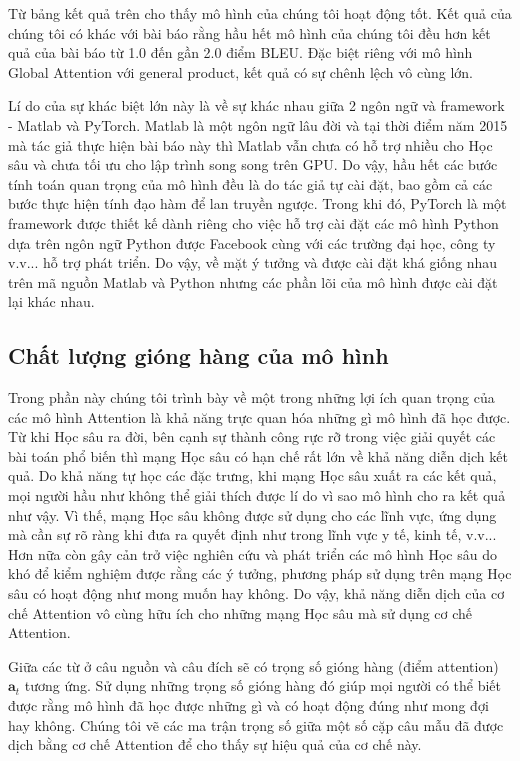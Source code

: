 Từ bảng kết quả trên cho thấy mô hình của chúng tôi hoạt động tốt. Kết quả của chúng tôi có khác với bài báo rằng hầu hết mô hình của chúng tôi đều hơn kết quả của bài báo từ 1.0 đến gần 2.0 điểm BLEU. Đặc biệt riêng với mô hình Global Attention với general product, kết quả có sự chênh lệch vô cùng lớn.

Lí do của sự khác biệt lớn này là về sự khác nhau giữa 2 ngôn ngữ và framework - Matlab và PyTorch. Matlab là một ngôn ngữ lâu đời và tại thời điểm năm 2015 mà tác giả thực hiện bài báo này thì Matlab vẫn chưa có hỗ trợ nhiều cho Học sâu và chưa tối ưu cho lập trình song song trên GPU. Do vậy, hầu hết các bước tính toán quan trọng của mô hình đều là do tác giả tự cài đặt, bao gồm cả các bước thực hiện tính đạo hàm để lan truyền ngược. Trong khi đó, PyTorch là một framework được thiết kế dành riêng cho việc hỗ trợ cài đặt các mô hình Python dựa trên ngôn ngữ Python được Facebook cùng với các trường đại học, công ty v.v... hỗ trợ phát triển. Do vậy, về mặt ý tưởng và được cài đặt khá giống nhau trên mã nguồn Matlab và Python nhưng các phần lõi của mô hình được cài đặt lại khác nhau.

\subsection{Chất lượng gióng hàng của mô hình}
Trong phần này chúng tôi trình bày về một trong những lợi ích quan trọng của các mô hình Attention là khả năng trực quan hóa những gì mô hình đã học được. Từ khi Học sâu ra đời, bên cạnh sự thành công rực rỡ trong việc giải quyết các bài toán phổ biến thì mạng Học sâu có hạn chế rất lớn về khả năng diễn dịch kết quả. Do khả năng tự học các đặc trưng, khi mạng Học sâu xuất ra các kết quả, mọi người hầu như không thể giải thích được lí do vì sao mô hình cho ra kết quả như vậy. Vì thế, mạng Học sâu không được sử dụng cho các lĩnh vực, ứng dụng mà cần sự rõ ràng khi đưa ra quyết định như trong lĩnh vực y tế, kinh tế, v.v... Hơn nữa còn gây cản trở việc nghiên cứu và phát triển các mô hình Học sâu do khó để kiểm nghiệm được rằng các ý tưởng, phương pháp sử dụng trên mạng Học sâu có hoạt động như mong muốn hay không. Do vậy, khả năng diễn dịch của cơ chế Attention vô cùng hữu ích cho những mạng Học sâu mà sử dụng cơ chế Attention.

Giữa các từ ở câu nguồn và câu đích sẽ có trọng số gióng hàng (điểm attention) $\bm{a}_t$ tương ứng. Sử dụng những trọng số gióng hàng đó giúp mọi người có thể biết được rằng mô hình đã học được những gì và có hoạt động đúng như mong đợi hay không. Chúng tôi vẽ các ma trận trọng số giữa một số cặp câu mẫu đã được dịch bằng cơ chế Attention để cho thấy sự hiệu quả của cơ chế này.